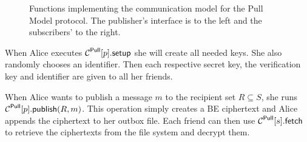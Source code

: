 \begin{figure}%
  \caption{%
    Functions implementing the communication model for the Pull Model protocol.
    The publisher's interface is to the left and the subscribers' to the right.
  }\label{PullFunctions}
\end{figure}

When Alice executes \(\psetup{p}\) she will create all needed keys.
She also randomly chooses an identifier.
Then each respective secret key, the verification key and identifier are given 
to all her friends.

When Alice wants to publish a message \(m\) to the recipient set \(R\subseteq 
  S\), she runs \(\ppub{p}[R][m]\).
This operation simply creates a \ac{BE} ciphertext and Alice appends the 
ciphertext to her outbox file.
Each friend can then use \(\pget{s}\) to retrieve the ciphertexts from the file 
system and decrypt them.

